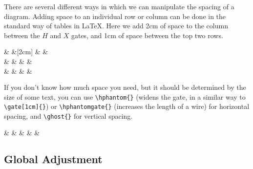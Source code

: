 \documentclass[aps,pra,10pt,nofootinbib]{revtex4-2}
\begin{document}
There are several different ways in which we can manipulate the spacing of a diagram. Adding space to an individual row or column can be done in the standard way of tables in LaTeX. Here we add 2cm of space to the column between the $H$ and $X$ gates, and 1cm of space between the top two rows.
\begin{Code}
  \begin{quantikz}
    &  &[2cm]  &  & \\[1cm]
    &  &  &  &\\
    &  &  &  &
  \end{quantikz}
\end{Code}
If you don't know how much space you need, but it should be determined by the size of some text, you can use \verb!\hphantom{}! (widens the gate, in a similar way to \verb!\gate[1cm]{}!) or \verb!\hphantomgate{}! (increases the length of a wire) for horizontal spacing, and \verb!\ghost{}! for vertical spacing.
\begin{Code}
  \begin{quantikz}
    &  \hphantom{very wide} &  &  &  &
  \end{quantikz}
\end{Code}

\subsection{Global Adjustment}
\end{document}
